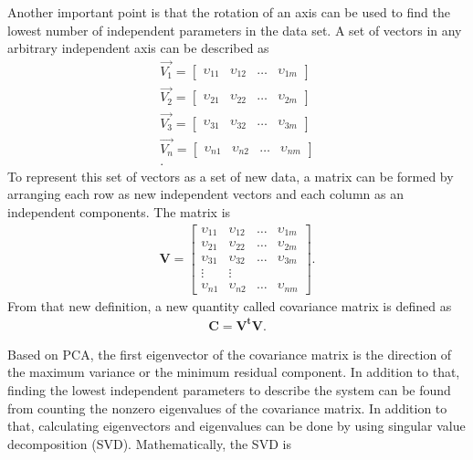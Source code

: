 Another important point is that the rotation of an axis can be used to find the lowest number of independent parameters in the data set. A set of vectors in any arbitrary independent axis can be described as
\begin{eqnarray}
\vec{V_{1}}=
\begin{bmatrix}
\upsilon_{11}&\upsilon_{12} & \ldots & \upsilon_{1m}
\end{bmatrix}\\ \nonumber
\vec{V_{2}}=
\begin{bmatrix}
\upsilon_{21}&\upsilon_{22} & \ldots & \upsilon_{2m}
\end{bmatrix}\\ \nonumber
\vec{V_{3}}=
\begin{bmatrix}
\upsilon_{31}&\upsilon_{32} & \ldots & \upsilon_{3m}
\end{bmatrix}\\ \nonumber
\vec{V_{n}}=
\begin{bmatrix}
\upsilon_{n1}&\upsilon_{n2} & \ldots & \upsilon_{nm}
\end{bmatrix}\\ \nonumber
.
\end{eqnarray}
To represent this set of vectors as a set of new data, a matrix can be formed by arranging each row as new independent vectors and each column as an independent components. The matrix is  
\begin{eqnarray}
\mathbf{V}=
\begin{bmatrix}
\upsilon_{11}&\upsilon_{12} & \ldots & \upsilon_{1m} \\
\upsilon_{21}&\upsilon_{22} & \ldots & \upsilon_{2m} \\
\upsilon_{31}&\upsilon_{32} & \ldots & \upsilon_{3m} \\
\vdots & \vdots \\
\upsilon_{n1}&\upsilon_{n2} & \ldots & \upsilon_{nm} 
\end{bmatrix}.
\end{eqnarray} 
From that new definition, a new quantity called covariance matrix is defined as
\begin{eqnarray}
\mathbf{C}=\mathbf{V^{t}}\mathbf{V}.
\end{eqnarray} 

Based on PCA, the first eigenvector of the covariance matrix is the direction of the maximum variance or the minimum residual component. In addition to that, finding the lowest independent parameters to describe the system can be found from counting the nonzero eigenvalues of the covariance matrix. In addition to that, calculating eigenvectors and eigenvalues can be done by using singular value decomposition (SVD). Mathematically, the SVD is 

